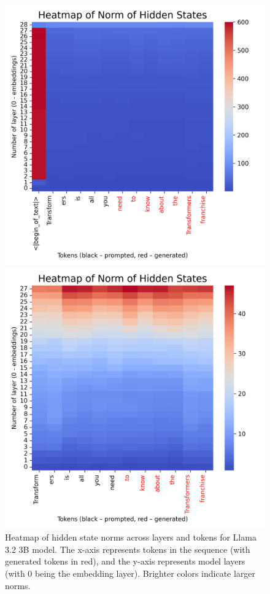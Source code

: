 \begin{figure}[h]
    \centering
    \begin{minipage}{0.48\textwidth}
        \centering
        \includegraphics[width=\textwidth]{images/heatmap_3b_full.png}
        \caption{Heatmap of hidden state norms across layers and tokens for Llama 3.2 3B model. The x-axis represents tokens in the sequence (with generated tokens in red), and the y-axis represents model layers (with 0 being the embedding layer). Brighter colors indicate larger norms.}
        \label{fig:heatmap_3b_full}
    \end{minipage}
    \hfill
    \begin{minipage}{0.48\textwidth}
        \centering
        \includegraphics[width=\textwidth]{images/heatmap_3b_notfull.png}

\end{minipage}
\end{figure}
